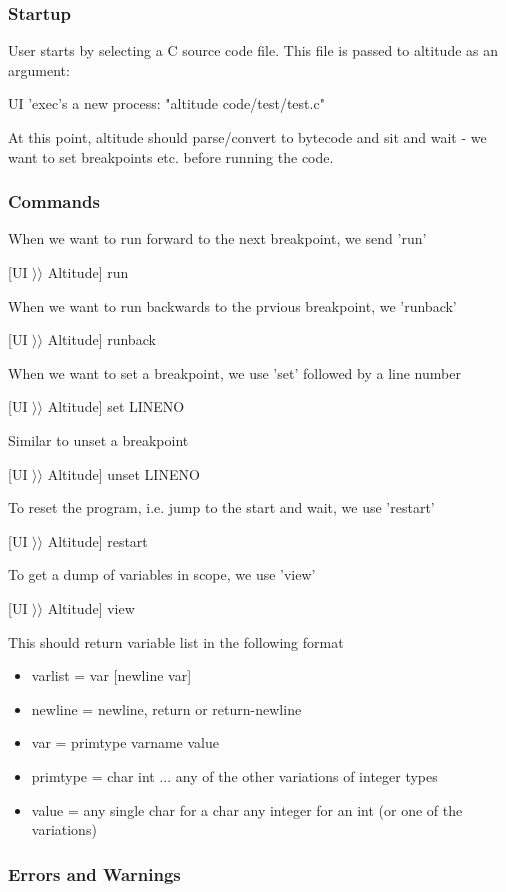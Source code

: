 \documentclass[10pt,a4paper]{report}
\begin{document}
\subsubsection{Startup}
User starts by selecting a C source code file. This file is passed to altitude as an argument:

UI 'exec's a new process: "altitude code/test/test.c"

At this point, altitude should parse/convert to bytecode and sit and wait - we want to set breakpoints etc. before running the code.

\subsubsection{Commands}

When we want to run forward to the next breakpoint, we send 'run'

[UI $\rangle\rangle$ Altitude] run

When we want to run backwards to the prvious breakpoint, we 'runback'

[UI $\rangle\rangle$ Altitude] runback

When we want to set a breakpoint, we use 'set' followed by a line number

[UI $\rangle\rangle$ Altitude] set LINENO

Similar to unset a breakpoint

[UI $\rangle\rangle$ Altitude] unset LINENO

To reset the program, i.e. jump to the start and wait, we use 'restart'

[UI $\rangle\rangle$ Altitude] restart

To get a dump of variables in scope, we use 'view'

[UI $\rangle\rangle$ Altitude] view

This should return variable list in the following format
\begin{itemize}
\item varlist = var [newline var]
\item newline = newline, return or return-newline
\item var = primtype varname value
\item primtype = char  int ... any of the other variations of integer types
\item value = any single char for a char  any integer for an int (or one of the variations)
\end{itemize}

\subsubsection{Errors and Warnings}
\end{document}
